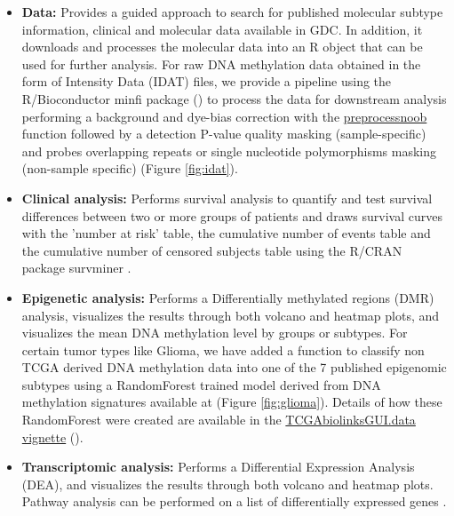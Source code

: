 \begin{itemize}
	\item \textbf{Data:} Provides a guided approach to search for published molecular subtype information, clinical and molecular data available in GDC. In addition, it downloads and processes the molecular data into an R object that can be used for further analysis. For raw DNA methylation data obtained in the form of Intensity Data (IDAT) files, we provide a pipeline using the R/Bioconductor minfi package () to process the data for downstream analysis \cite{aryee2014minfi} performing a background and dye-bias correction with the \href{https://www.bioconductor.org/help/course-materials/2015/BioC2015/methylation450k.html\#preprocessnoob}{preprocessnoob} function followed by a detection P-value quality masking (sample-specific) \cite{morris2015analysis} and probes overlapping repeats or single nucleotide polymorphisms masking (non-sample specific) \cite{zhou2016comprehensive} (Figure \ref{fig:idat}).
	\item \textbf{Clinical analysis:} Performs survival analysis to quantify and test survival differences between two or more groups of patients and draws survival curves with the 'number at risk' table, the cumulative number of events table and the cumulative number of censored subjects table using the R/CRAN package survminer \cite{survminer}.
	\item \textbf{Epigenetic analysis:} Performs a Differentially methylated regions (DMR) analysis, visualizes the results through both volcano and heatmap plots, and visualizes the mean DNA methylation level by groups or subtypes. For certain tumor types like Glioma, we have added a function to classify non TCGA derived DNA methylation data into one of the 7 published epigenomic subtypes \cite{ceccarelli2016molecular} using a RandomForest trained model derived from DNA methylation signatures available at  (Figure \ref{fig:glioma}). Details of how these RandomForest were created are available in the \href{https://bioconductor.org/packages/devel/data/experiment/vignettes/TCGAbiolinksGUI.data/inst/doc/vignettes.html}{TCGAbiolinksGUI.data vignette} ().
	\item \textbf{Transcriptomic analysis:} Performs a Differential Expression Analysis (DEA), and visualizes the results through both volcano and heatmap plots. Pathway analysis can be performed on a list of differentially expressed genes \cite{luo2013pathview}.

\end{itemize}
